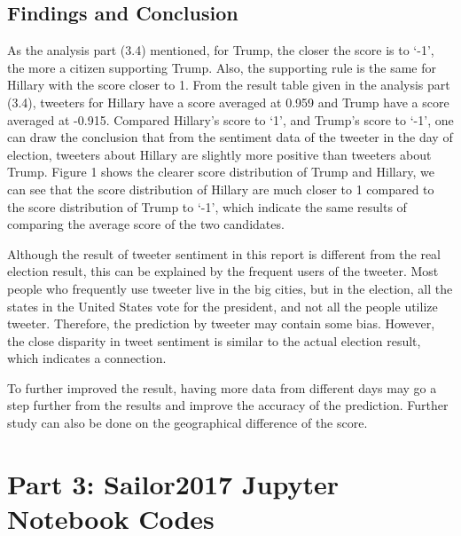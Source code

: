 \documentclass[12pt,a4paper]{report}
\begin{document}
  \section{Findings and Conclusion}

    As the analysis part (3.4) mentioned, for Trump, the closer the score is to ‘-1’, the more a citizen supporting Trump. Also, the supporting rule is the same for Hillary with the score closer to 1. From the result table given in the analysis part (3.4), tweeters for Hillary have a score averaged at 0.959 and Trump have a score averaged at -0.915. Compared Hillary’s score to ‘1’, and Trump’s score to ‘-1’, one can draw the conclusion that from the sentiment data of the tweeter in the day of election, tweeters about Hillary are slightly more positive than tweeters about Trump. Figure 1 shows the clearer score distribution of Trump and Hillary, we can see that the score distribution of Hillary are much closer to 1 compared to the score distribution of Trump to ‘-1’, which indicate the same results of comparing the average score of the two candidates.

    Although the result of tweeter sentiment in this report is different from the real election result, this can be explained by the frequent users of the tweeter. Most people who frequently use tweeter live in the big cities, but in the election, all the states in the United States vote for the president, and not all the people utilize tweeter. Therefore, the prediction by tweeter may contain some bias. However, the close disparity in tweet sentiment is similar to the actual election result, which indicates a connection.

    To further improved the result, having more data from different days may go a step further from the results and improve the accuracy of the prediction. Further study can also be done on the geographical difference of the score.


\chapter{Part 3: Sailor2017 Jupyter Notebook Codes}

  
  
\end{document}
